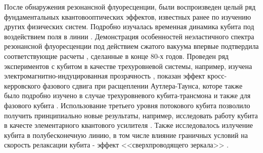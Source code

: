 После обнаружения резонансной флуоресценции, были воспроизведен целый ряд фундаментальных квантовооптических эффектов, известных ранее по изучению других физических систем. Подробно изучалась временная динамика кубита под воздействием поля в линии \cite{abdumalikov2011dynamics}. Демонстрация особенностей неэластичного спектра резонансной флуоресценции под действием сжатого вакуума \cite{Toyli2016ResSqueez} впервые подтвердила соответствующие расчеты \cite{CarmichaelSqueezedFluor}, сделанные в конце 80-х годов. Проведен ряд экспериментов с кубитом в качестве трехуровневой системы, например, изучена электромагнитно-индуцированная прозрачность \cite{Abdumalikov_EIT}, показан эффект кросс-керровского фазового сдвига \cite[]{Delsing-giant-Kross-Kerr} при расщеплении Аутлера-Таунса, которе также было подробно изучено в случае трехуровневого кубита-трансмона \cite[]{ATS_3LS,ATS_3D_transmon,Baur} и также для фазового кубита \cite{li2012dynamical}. Использование третьего уровня потокового кубита позволило получить принципиально новые результаты, например, исследовать работу кубита в качесте элементарного квантового усилителя \cite[]{Astafiev-quantum-amplifier}. Также исследовалось излучение кубита в полубесконечную линию, в том числе влияние граничных условий на скорость релаксации кубита - эффект <<сверхпроводящего зеркала>> \cite[]{hoi2015probing}.   

